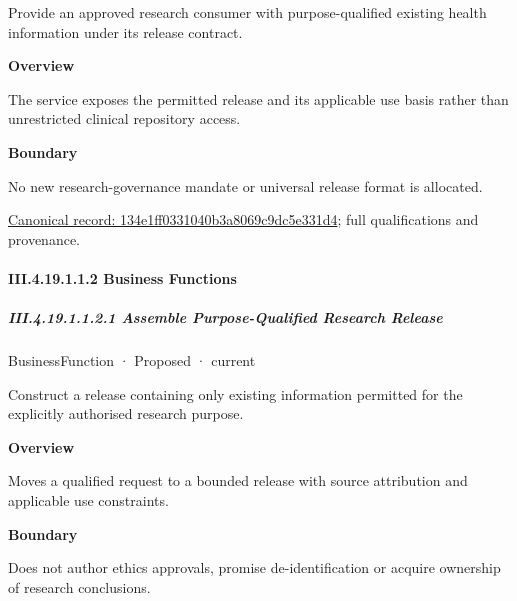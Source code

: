 Provide an approved research consumer with purpose-qualified existing health information under its release contract.



\textbf{Overview}



The service exposes the permitted release and its applicable use basis rather than unrestricted clinical repository access.



\textbf{Boundary}



No new research-governance mandate or universal release format is allocated.


{\footnotesize \href{../../../../../../../../continuum/business/business-service/134e1ff0331040b3a8069c9dc5e331d4.md}{Canonical record: 134e1ff0331040b3a8069c9dc5e331d4}; full qualifications and provenance.}\par
\paragraph*{III.4.19.1.1.2 Business Functions}
\label{navigation:III.4.19.1.1.2}

\subparagraph*{III.4.19.1.1.2.1 Assemble Purpose-Qualified Research Release}
\label{navigation:III.4.19.1.1.2.1}

\label{element:bf4354a421174a9ba56c281f4dcd11f6}
{\small BusinessFunction · Proposed · current}\par

Construct a release containing only existing information permitted for the explicitly authorised research purpose.



\textbf{Overview}



Moves a qualified request to a bounded release with source attribution and applicable use constraints.



\textbf{Boundary}



Does not author ethics approvals, promise de-identification or acquire ownership of research conclusions.


